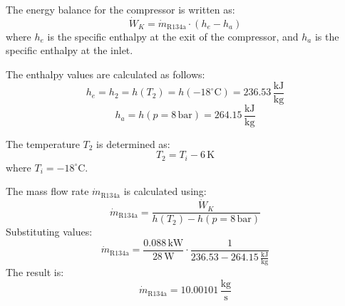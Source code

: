 The energy balance for the compressor is written as:  
\[
\dot{W}_K = \dot{m}_{\text{R134a}} \cdot (h_e - h_a)
\]  
where \( h_e \) is the specific enthalpy at the exit of the compressor, and \( h_a \) is the specific enthalpy at the inlet.  

The enthalpy values are calculated as follows:  
\[
h_e = h_2 = h(T_2) = h(-18^\circ\text{C}) = 236.53 \, \frac{\text{kJ}}{\text{kg}}
\]  
\[
h_a = h(p = 8 \, \text{bar}) = 264.15 \, \frac{\text{kJ}}{\text{kg}}
\]  

The temperature \( T_2 \) is determined as:  
\[
T_2 = T_i - 6 \, \text{K}
\]  
where \( T_i = -18^\circ\text{C} \).  

The mass flow rate \( \dot{m}_{\text{R134a}} \) is calculated using:  
\[
\dot{m}_{\text{R134a}} = \frac{\dot{W}_K}{h(T_2) - h(p = 8 \, \text{bar})}
\]  
Substituting values:  
\[
\dot{m}_{\text{R134a}} = \frac{0.088 \, \text{kW}}{28 \, \text{W}} \cdot \frac{1}{236.53 - 264.15 \, \frac{\text{kJ}}{\text{kg}}}
\]  
The result is:  
\[
\dot{m}_{\text{R134a}} = 10.00101 \, \frac{\text{kg}}{\text{s}}
\]